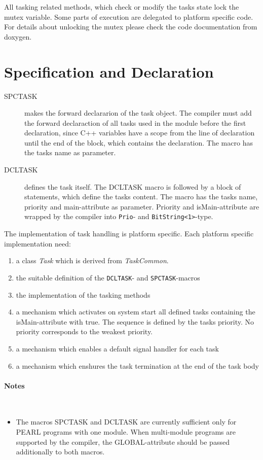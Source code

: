 All tasking related methods, which check or modify  the tasks state lock the 
mutex variable. Some parts of execution are delegated to platform specific
code. For details about unlocking the mutex please check the code
documentation from doxygen.



\section{Specification and Declaration}
\begin{description}
\item[SPCTASK] makes the forward declararion of the task object.
    The compiler must add the forward declaraction of all tasks
    used in the module before the first declaration, since C++
    variables have a scope from the line of declaration until 
    the end of the block, which contains the declaration.
    The macro has the tasks name as parameter.
\item[DCLTASK] defines the task itself. The DCLTASK macro is followed
    by a block of statements, which define the tasks content.
    The macro has the tasks name, priority and main-attribute as
    parameter. 
    Priority and isMain-attribute are wrapped by the compiler 
    into \verb|Prio|- and \verb|BitString<1>|-type.
\end{description}

The implementation of task handling is platform specific.
Each platform specific implementation need:
\begin{enumerate}
\item  a class {\em Task} which is derived from {\em TaskCommon}.
\item the suitable definition of the \verb|DCLTASK|- and \verb|SPCTASK|-macros
\item the implementation of the tasking methods
\item a mechanism which activates on system start
   all defined tasks containing the isMain-attribute with true. 
   The sequence is defined by the tasks priority. 
   No priority corresponds to the weakest priority.
\item a mechanism which enables a default signal handler for each task
\item a mechanism which enshures the task termination at the end of
   the task body
\end{enumerate}

\paragraph{Notes}\ \\
\begin{itemize}
\item The macros SPCTASK and DCLTASK are currently sufficient only for
    PEARL programs with one module. When multi-module programs
    are supported by the compiler, the GLOBAL-attribute should be 
    passed additionally to both macros.
\end{itemize}

